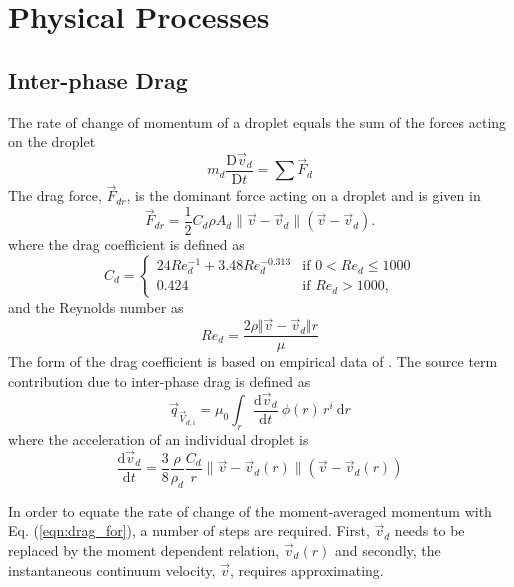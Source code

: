 \documentclass[a4paper,10pt]{article}
\begin{document}
\section{Physical Processes} \label{sec:phys_proc}
\subsection{Inter-phase Drag}
The rate of change of momentum of a droplet equals the sum of the forces acting on the droplet
\begin{equation} \label{eqn:lag_mome}
m_{d} \frac{\mathrm{D} \vec{v}_{d}}{\mathrm{D} t} = \sum \vec{F}_{d}
\end{equation}
The drag force, $\vec{F}_{dr}$, is the dominant force acting on a droplet and is given in \cite{crowe1998}
\begin{equation} \label{eqn:drag_for}
\vec{F}_{dr} = \frac{1}{2} C_{d} \rho A_{d} \parallel \vec{v}
- \vec{v}_{d} \parallel \left( \vec{v} - \vec{v}_{d} \right).
\end{equation}
where the drag coefficient is defined as
\begin{equation} \label{eqn:cd_lim}
C_{d} =
\begin{cases}
24 Re_{d}^{-1} + 3.48 Re_{d}^{-0.313} & \text{if $0 < Re_{d} \leq 1000$} \\
0.424 & \text{if $Re_{d} > 1000$},
\end{cases}
\end{equation}
and the Reynolds number as
\begin{equation} \label{eqn:re_d_num}
Re_{d} = \frac{2 \rho \Vert \vec{v}-\vec{v}_{d} \Vert r}{\mu}
\end{equation}
The form of the drag coefficient is based on empirical data of \cite{nicholls1972}. The source term contribution due to inter-phase drag is defined as
\begin{equation} \label{eqn:dragSource}
\vec{q}_{\vec{V}_{d,i}} = \mu_{0} \int_{r} \frac{\mathrm{d}\vec{v}_{d}}{\mathrm{d}t} \: \phi(r) \, r^{i} \: \mathrm{d}r
\end{equation}
where the acceleration of an individual droplet is
\begin{equation}
\frac{\mathrm{d}\vec{v}_{d}}{\mathrm{d}t} = \frac{3}{8} \frac{\rho}{\rho_{d}} \frac{C_{d}}{r}
\parallel \vec{v} - \vec{v}_{d}(r) \parallel \left( \vec{v} - \vec{v}_{d}(r) \right)
\end{equation}

In order to equate the rate of change of the moment-averaged momentum with Eq. (\ref{eqn:drag_for}), a number of steps are required.  First, $\vec{v}_{d}$ needs to be replaced by the moment dependent relation, $\vec{v}_{d}(r)$ and secondly, the instantaneous continuum velocity, $\vec{v}$, requires approximating.
\end{document}

